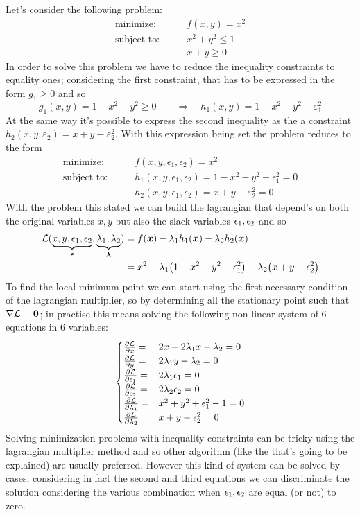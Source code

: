 	\begin{example}{} \label{ex:min:inequ}
		Let's consider the following problem:\begin{align*}
			\textrm{minimize:} \qquad & f(x,y) = x^2 \\
			\textrm{subject to:}\qquad & x^2+y^2\leq 1 \\ & x+y \geq 0
		\end{align*}
		In order to solve this problem we have to reduce the inequality constraints to equality ones; considering the first constraint, that has to be expressed in the form $g_1 \geq 0$ and so
		\[ g_1(x,y) = 1 -x^2-y^2 \geq 0 \qquad \Rightarrow \quad h_1(x,y) = 1-x^2-y^2-\varepsilon_1^2 \]
		At the same way it's possible to express the second inequality as the a constraint $h_2(x,y,\varepsilon_2) = x+y-\varepsilon_2^2$. With this expression being set the problem reduces to the form\begin{align*}
			\textrm{minimize:} \qquad & f(x,y,\epsilon_1,\epsilon_2) = x^2 \\
			\textrm{subject to:}\qquad & h_1(x,y,\epsilon_1,\epsilon_2) = 1- x^2 - y^2  - \epsilon_1^2 = 0 \\ & h_2(x,y,\epsilon_1,\epsilon_2) = x+y - \varepsilon_2^2 = 0
		\end{align*}
		With the problem this stated we can build the lagrangian that depend's on both the original variables $x,y$ but also the slack variables $\epsilon_1,\epsilon_{2}$ and so
		\begin{align*}
			\mathcal L(\underbrace{x,y,\epsilon_{1},\epsilon_{2}}_{\boldsymbol{\epsilon}},\underbrace{\lambda_1,\lambda_2}_{\boldsymbol{\lambda}}) &= f(\boldsymbol{x}) - \lambda_1 h_1(\boldsymbol{x}) - \lambda_2 h_2(\boldsymbol{x}) \\
			& = x^2 - \lambda_1 \big( 1- x^2-y^2-\epsilon_{1}^2 \big) - \lambda_2 \big( x+y-\epsilon_{2}^2 \big)
		\end{align*}
		To find the local minimum point we can start using the first necessary condition of the lagrangian multiplier, so by determining all the stationary point such that $\nabla \mathcal L = \boldsymbol{0}$; in practise this means solving the following non linear system of 6 equations in 6 variables:
		\[ \begin{cases}
			\frac{\partial \mathcal L}{\partial x} =& 2x -2\lambda_1x -\lambda_2  = 0 \\
			\frac{\partial \mathcal L}{\partial y} =& 2\lambda_1 y - \lambda_2  = 0\\
			\frac{\partial \mathcal L}{\partial \epsilon_{1}} =& 2\lambda_1\epsilon_{1}  = 0 \\
			\frac{\partial \mathcal L}{\partial \epsilon_{2}} =& 2\lambda_2 \epsilon_{2}  =  0 \\
			\frac{\partial \mathcal L}{\partial \lambda_1} =& x^2+y^2 + \epsilon_{1} ^2-1  = 0 \\
			\frac{\partial \mathcal L}{\partial \lambda_2} =& x + y - \epsilon_{2}^2 = 0
		\end{cases} \]
		Solving minimization problems with inequality constraints can be tricky using the lagrangian multiplier method and so other algorithm (like the \kkt that's going to be explained) are usually preferred. However this kind of system can be solved by cases; considering in fact the second and third equations we can discriminate the solution considering the various combination when $\epsilon_{1},\epsilon_{2}$ are equal (or not) to zero.
		

\end{example}
